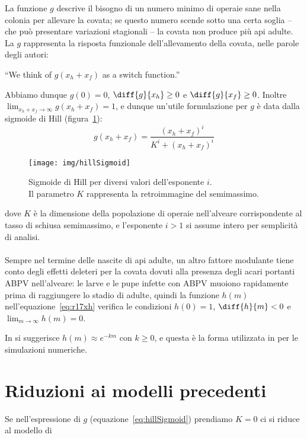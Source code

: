 La funzione $g$ descrive il bisogno di un numero minimo di operaie sane nella colonia per allevare la covata; se questo numero scende sotto una certa soglia -- che può presentare variazioni stagionali -- la covata non produce più api adulte.
La $g$ rappresenta la risposta funzionale dell'allevamento della covata, nelle parole degli autori:
\begin{displayquote}
``We think of $g(x_h + x_f)$ as a switch function.''
\end{displayquote}

Abbiamo dunque $g(0)=0$, $\diff{g}{x_h} \geq 0$ e $\diff{g}{x_f} \geq 0$. Inoltre $\lim_{x_h+x_f \to \infty} g(x_h+x_f)=1$, e dunque un'utile formulazione per $g$ è data dalla sigmoide di Hill (figura~\ref{img:hillSigmoid}):
\begin{equation}
    g(x_h + x_f) = \frac{ (x_h+x_f)^i }{ K^i + (x_h+x_f)^i }
    \label{eq:hillSigmoid}
\end{equation}

\begin{figure}
    \centering
    \texttt{[image: img/hillSigmoid]}

    \caption[Sigmoidi di Hill.]{Sigmoide di Hill per diversi valori dell'esponente $i$.
        \\ Il parametro $K$ rappresenta la retroimmagine del semimassimo.}
    \label{img:hillSigmoid}
\end{figure}

dove $K$ è la dimensione della popolazione di operaie nell'alveare corrispondente al tasso di schiusa semimassimo, e l'esponente $i>1$ si assume intero per semplicità di analisi.

\paragraph{}
Sempre nel termine delle nascite di api adulte, un altro fattore modulante tiene conto degli effetti deleteri per la covata dovuti alla presenza degli acari portanti ABPV nell'alveare: le larve e le pupe infette con ABPV muoiono rapidamente prima di raggiungere lo stadio di adulte, quindi la funzione $h(m)$ nell'equazione~\ref{eq:r17xh} verifica le condizioni $h(0)=1$, $\diff{h}{m} <0$ e $\lim_{m \to \infty} h(m) = 0$.

In \cite{sumMar04} si suggerisce $h(m) \approx e^{-km}$ con $k\geq0$, e questa è la forma utilizzata in \cite{ratti2017} per le simulazioni numeriche.


\section{Riduzioni ai modelli precedenti}
Se nell'espressione di $g$ (equazione~\eqref{eq:hillSigmoid}) prendiamo $K=0$ ci si riduce al modello di \cite{sumMar04}



